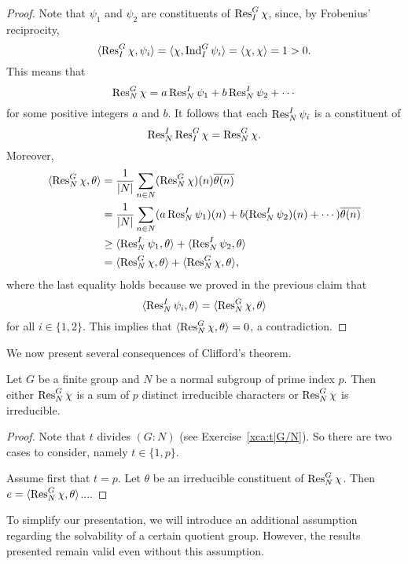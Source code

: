 \begin{proof}
    Note that $\psi_1$ and $\psi_2$ are constituents
    of $\operatorname{Res}_I^G\chi$, since, by Frobenius' reciprocity, 
    \[
    \langle\operatorname{Res}_I^G\chi,\psi_i\rangle=
    \langle\chi,\operatorname{Ind}_I^G\psi_i\rangle=\langle\chi,\chi\rangle=1>0.
    \]
    This means that 
    \[
    \operatorname{Res}_N^G\chi=a\operatorname{Res}_N^I\psi_1+b\operatorname{Res}_N^I\psi_2+\cdots 
    \]
    for some positive integers $a$ and $b$. 
    It follows that each $\operatorname{Res}_N^I\psi_i$ is a constituent
    of 
    \[
    \operatorname{Res}_N^I\operatorname{Res}_I^G\chi=\operatorname{Res}_N^G\chi.
    \]
    Moreover, 
    \begin{align*}
        \langle\operatorname{Res}_N^G\chi,\theta\rangle &= \frac{1}{|N|}\sum_{n\in N}(\operatorname{Res}_N^G\chi)(n)\overline{\theta(n)}\\
        &=\frac{1}{|N|}\sum_{n\in N}(a\operatorname{Res}_N^I\psi_1)(n)+b(\operatorname{Res}_N^I\psi_2)(n)+\cdots)\overline{\theta(n)}\\
        &\geq\langle\operatorname{Res}_N^I\psi_1,\theta\rangle+\langle\operatorname{Res}_N^I\psi_2,\theta\rangle\\
        &=\langle\operatorname{Res}_N^G\chi,\theta\rangle+\langle\operatorname{Res}_N^G\chi,\theta\rangle,
    \end{align*}
    where the last equality holds because we proved in the previous claim that 
    \[
        \langle\operatorname{Res}_N^I\psi_i,\theta\rangle=\langle\operatorname{Res}_N^G\chi,\theta\rangle
    \]
    for all $i\in\{1,2\}$. 
    This implies that $\langle\operatorname{Res}_N^G\chi,\theta\rangle=0$, a contradiction. 
\end{proof}

We now present several consequences of Clifford’s theorem.

\begin{theorem}
    Let $G$ be a finite group and $N$ be a normal subgroup of prime index $p$. Then either $\operatorname{Res}_N^G\chi$ is a sum of $p$ 
    distinct irreducible characters or $\operatorname{Res}_N^G\chi$ is irreducible. 
\end{theorem}

\begin{proof}
    Note that $t$ divides $(G:N)$ (see Exercise~\ref{xca:t|G/N}). 
    So there are two cases
    to consider, namely $t\in\{1,p\}$. 

    Assume first that $t=p$. Let $\theta$ be an irreducible constituent of $\operatorname{Res}_N^G\chi$. Then $e=\langle\operatorname{Res}_N^G\chi,\theta\rangle$.... 
\end{proof}

To simplify our presentation, we will introduce an additional assumption regarding the solvability of a certain quotient group. However, the results presented remain valid even without this assumption.

